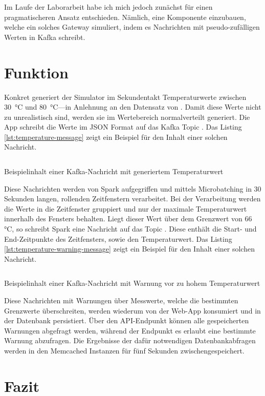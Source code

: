 Im Laufe der Laborarbeit habe ich mich jedoch zunächst für einen pragmatischeren Ansatz entschieden.
Nämlich, eine Komponente einzubauen, welche ein solches Gateway simuliert, indem es Nachrichten mit pseudo-zufälligen Werten in Kafka schreibt.

\section{Funktion}\label{sec:funktion}

Konkret generiert der Simulator im Sekundentakt Temperaturwerte zwischen 30~°C und 80~°C---in Anlehnung an den Datensatz von \cite{helwig_condition_2015}.
Damit diese Werte nicht zu unrealistisch sind, werden sie im Wertebereich normalverteilt generiert.
Die App schreibt die Werte im JSON Format auf das Kafka Topic .
Das Listing \ref{lst:temperature-message} zeigt ein Beispiel für den Inhalt einer solchen Nachricht.

\begin{listing}[H]
  \inputminted{json}{assets/src/temperature-message.json}
  \caption{Beispielinhalt einer Kafka-Nachricht mit generiertem Temperaturwert}\label{lst:temperature-message}
\end{listing}

Diese Nachrichten werden von Spark aufgegriffen und mittels Microbatching in 30 Sekunden langen, rollenden Zeitfenstern verarbeitet.
Bei der Verarbeitung werden die Werte in die Zeitfenster gruppiert und nur der maximale Temperaturwert innerhalb des Fensters behalten.
Liegt dieser Wert über dem Grenzwert von 66 °C, so schreibt Spark eine Nachricht auf das Topic .
Diese enthält die Start- und End-Zeitpunkte des Zeitfensters, sowie den Temperaturwert.
Das Listing \ref{lst:temperature-warning-message} zeigt ein Beispiel für den Inhalt einer solchen Nachricht.

\begin{listing}[H]
  \inputminted{json}{assets/src/temperature-warning-message.json}
  \caption{Beispielinhalt einer Kafka-Nachricht mit Warnung vor zu hohem Temperaturwert}\label{lst:temperature-warning-message}
\end{listing}

Diese Nachrichten mit Warnungen über Messwerte, welche die bestimmten Grenzwerte überschreiten, werden wiederum von der Web-App konsumiert und in der Datenbank persistiert.
Über den API-Endpunkt  können alle gespeicherten Warnungen abgefragt werden, während der Endpunkt  es erlaubt eine bestimmte Warnung abzufragen.
Die Ergebnisse der dafür notwendigen Datenbankabfragen werden in den Memcached Instanzen für fünf Sekunden zwischengespeichert.

\section{Fazit}\label{sec:fazit}
